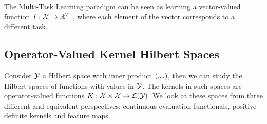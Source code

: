


The Multi-Task Learning paradigm can be seen as learning a vector-valued function
$f: \mathcal{X} \to \mathbb{R}^T$
, where each element of the vector corresponds to a different task. 


\subsection{Operator-Valued Kernel Hilbert Spaces}%
Consider $\mathcal{Y}$ a Hilbert space with inner product $\left( ., . \right)$, then we can study the Hilbert spaces of functions with values in $\mathcal{Y}$. The kernels in such spaces are operator-valued functions $K: \mathcal{X} \times \mathcal{X} \to \mathcal{L}(\mathcal{Y})$.
We look at these spaces from three different and equivalent perspectives: continuous evaluation functionals, positive-definite kernels and feature maps.

